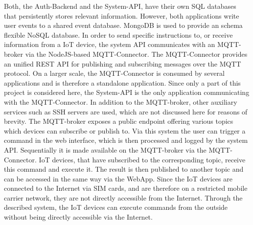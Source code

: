        Both, the Auth-Backend and the System-\ac{API}, have their own SQL databases that persistently stores relevant information. However, both applications write user events to a shared event database. MongoDB is used to provide an schema flexible NoSQL database. In order to send specific instructions to, or receive information from a \ac{IoT} device, the system \ac{API} communicates with an MQTT-broker via the NodeJS-based MQTT-Connector. The MQTT-Connector provides an unified \ac{REST} \ac{API} for publishing and subscribing messages over the MQTT protocol. On a larger scale, the MQTT-Connector is consumed by several applications and is therefore a standalone application. Since only a part of this project is considered here, the System-\ac{API} is the only application communicating with the MQTT-Connector. In addition to the MQTT-broker, other auxiliary services such as SSH servers are used, which are not discussed here for reasons of brevity. The MQTT-broker exposes a public endpoint offering various topics which devices can subscribe or publish to. Via this system the user can trigger a command in the web interface, which is then processed and logged by the system \ac{API}. Sequentially it is made available on the MQTT-broker via the MQTT-Connector. \ac{IoT} devices, that have subscribed to the corresponding topic, receive this command and execute it. The result is then published to another topic and can be accessed in the same way via the WebApp. Since the \ac{IoT} devices are connected to the Internet via SIM cards, and are therefore on a restricted mobile carrier network, they are not directly accessible from the Internet. Through the described system, the \ac{IoT} devices can execute commands from the outside without being directly accessible via the Internet.

